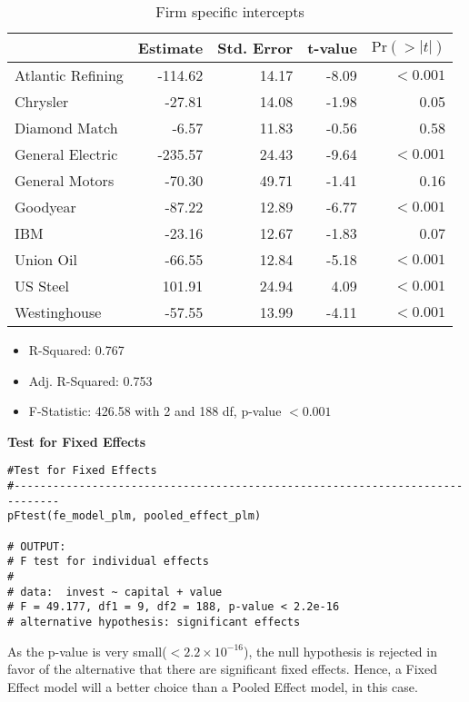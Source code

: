 \documentclass[a4paper]{article}
\begin{document}
\begin{table}[ht]
    \centering
    \begin{tabular}{lrrrr}
    \toprule
     & {Estimate} & {Std. Error} & {t-value} & \(\text{Pr}(>|t|)\) \\ \midrule
    Atlantic Refining   & -114.62 & 14.17 & -8.09  & $<0.001$ \\ 
    Chrysler            & -27.81  & 14.08 & -1.98  & 0.05  \\ 
    Diamond Match       & -6.57   & 11.83 & -0.56  & 0.58 \\ 
    General Electric    & -235.57 & 24.43 & -9.64  & $<0.001$ \\ 
    General Motors      & -70.30  & 49.71 & -1.41  & 0.16 \\ 
    Goodyear            & -87.22  & 12.89 & -6.77  & $<0.001$ \\ 
    IBM                 & -23.16  & 12.67 & -1.83  & 0.07  \\ 
    Union Oil           & -66.55  & 12.84 & -5.18  & $<0.001$  \\ 
    US Steel            & 101.91  & 24.94 & 4.09   & $<0.001$  \\ 
    Westinghouse        & -57.55  & 13.99 & -4.11  & $<0.001$  \\
    \bottomrule
    \end{tabular}
    \caption{Firm specific intercepts}
\end{table}
    
\begin{itemize}
    \item R-Squared: 0.767
    \item Adj. R-Squared: 0.753
    \item F-Statistic: 426.58 with 2 and 188 df, p-value \(<0.001\) 
\end{itemize}

\noindent\textbf{Test for Fixed Effects}

\begin{lstlisting}[caption={R Code for Test for Fixed Effects}]
#Test for Fixed Effects
#-----------------------------------------------------------------------------
pFtest(fe_model_plm, pooled_effect_plm)

# OUTPUT:
# F test for individual effects
# 
# data:  invest ~ capital + value
# F = 49.177, df1 = 9, df2 = 188, p-value < 2.2e-16
# alternative hypothesis: significant effects
\end{lstlisting}

As the p-value is very small(\(<2.2\times10^{-16}\)), the null hypothesis is rejected in favor of the alternative that there are significant fixed effects. Hence, a Fixed Effect model will a better
choice than a Pooled Effect model, in this case.
 
\end{document}
